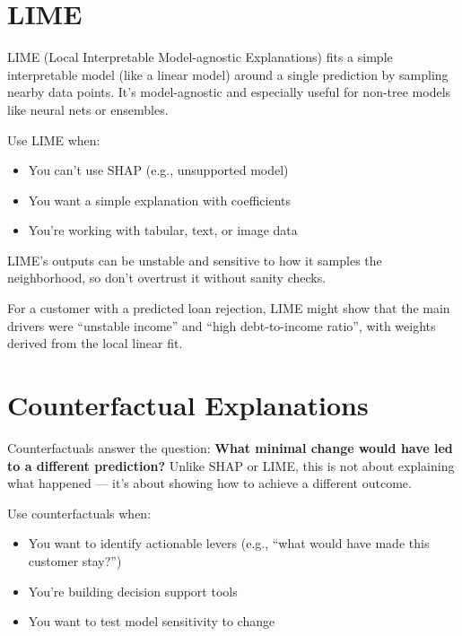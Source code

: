 \documentclass[12pt,openany]{book}
\begin{document}
\section{LIME}

LIME (Local Interpretable Model-agnostic Explanations) fits a simple interpretable model (like a linear model) around a single prediction by sampling nearby data points. It’s model-agnostic and especially useful for non-tree models like neural nets or ensembles.

Use LIME when:
\begin{itemize}
  \item You can’t use SHAP (e.g., unsupported model)
  \item You want a simple explanation with coefficients
  \item You’re working with tabular, text, or image data
\end{itemize}

\begin{notebox}
LIME’s outputs can be unstable and sensitive to how it samples the neighborhood, so don’t overtrust it without sanity checks.
\end{notebox}

\begin{examplebox}
For a customer with a predicted loan rejection, LIME might show that the main drivers were ``unstable income'' and ``high debt-to-income ratio'', with weights derived from the local linear fit.
\end{examplebox}



\section{Counterfactual Explanations}

Counterfactuals answer the question: \textbf{What minimal change would have led to a different prediction?} Unlike SHAP or LIME, this is not about explaining what happened — it’s about showing how to achieve a different outcome.

Use counterfactuals when:
\begin{itemize}
  \item You want to identify actionable levers (e.g., ``what would have made this customer stay?'')
  \item You're building decision support tools
  \item You want to test model sensitivity to change
\end{itemize}
\end{document}

